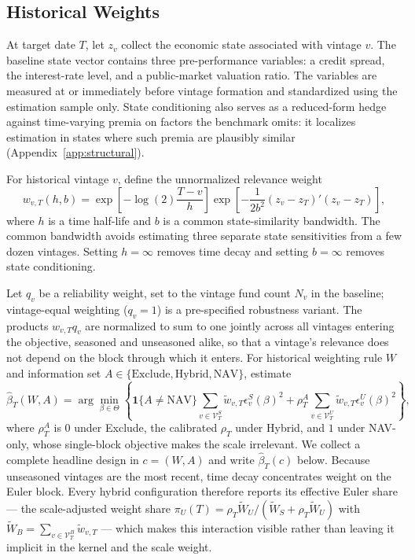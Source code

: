 \documentclass[11pt]{article}
\begin{document}
\subsection{Historical Weights}

At target date $T$, let $z_v$ collect the economic state associated with
vintage $v$. The baseline state vector contains three pre-performance
variables: a credit spread, the interest-rate level, and a public-market
valuation ratio. The variables are measured at or immediately before vintage
formation and standardized using the estimation sample only. State
conditioning also serves as a reduced-form hedge against time-varying premia
on factors the benchmark omits: it localizes estimation in states where such
premia are plausibly similar (Appendix~\ref{app:structural}).

For historical vintage $v$, define the unnormalized relevance weight
\[
w_{v,T}(h,b)
=
\exp\!\left[-\log(2)\frac{T-v}{h}\right]
\exp\!\left[-\frac{1}{2b^2}
  (z_v-z_T)'(z_v-z_T)\right],
\]
where $h$ is a time half-life and $b$ is a common state-similarity bandwidth.
The common bandwidth avoids estimating three separate state sensitivities
from a few dozen vintages. Setting $h=\infty$ removes time decay and setting
$b=\infty$ removes state conditioning.

Let $q_v$ be a reliability weight, set to the vintage fund count $N_v$ in the
baseline; vintage-equal weighting ($q_v=1$) is a pre-specified robustness
variant. The products $w_{v,T}q_v$ are normalized to sum to one jointly
across all vintages entering the objective, seasoned and unseasoned alike, so
that a vintage's relevance does not depend on the block through which it
enters. For historical weighting rule $W$ and information set
$A\in\{\mathrm{Exclude},\mathrm{Hybrid},\mathrm{NAV}\}$, estimate
\[
\widehat\beta_T(W,A)
=
\arg\min_{\beta\in\Theta}
\left\{
\mathbf 1\{A\neq\mathrm{NAV}\}
\sum_{v\in\mathcal V_T^S}\widetilde w_{v,T}
  \epsilon_v^S(\beta)^2
+
\rho_T^A
\sum_{v\in\mathcal V_T^U}\widetilde w_{v,T}
  \epsilon_v^U(\beta)^2
\right\},
\]
where $\rho_T^A$ is $0$ under Exclude, the calibrated $\rho_T$ under Hybrid,
and $1$ under NAV-only, whose single-block objective makes the scale
irrelevant. We collect a complete headline design in $c=(W,A)$ and write
$\widehat\beta_T(c)$ below. Because unseasoned vintages are the most recent,
time decay concentrates weight on the Euler block. Every hybrid configuration
therefore reports its effective Euler share --- the scale-adjusted weight
share
$\pi_U(T)=\rho_T\widetilde W_U/(\widetilde W_S+\rho_T\widetilde W_U)$ with
$\widetilde W_B=\sum_{v\in\mathcal V_T^B}\widetilde w_{v,T}$ --- which makes
this interaction visible rather than leaving it implicit in the kernel and
the scale weight.
\end{document}
